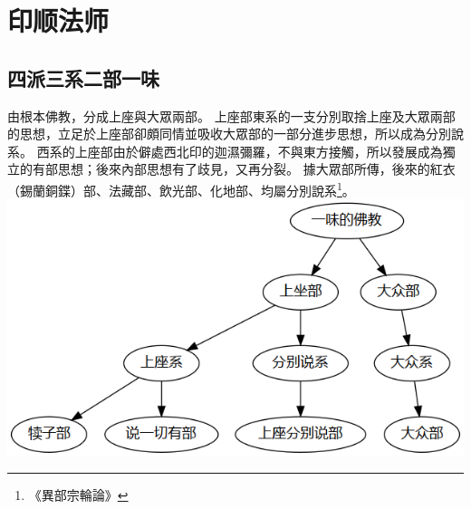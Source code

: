 \section{印顺法师}
\subsection{四派三系二部一味}
由根本佛教，分成上座與大眾兩部。
上座部東系的一支分別取捨上座及大眾兩部的思想，立足於上座部卻頗同情並吸收大眾部的一部分進步思想，所以成為分別說系。
西系的上座部由於僻處西北印的迦濕彌羅，不與東方接觸，所以發展成為獨立的有部思想；後來內部思想有了歧見，又再分裂。
據大眾部所傳，後來的紅衣（錫蘭銅鍱）部、法藏部、飲光部、化地部、均屬分別說系\footnote{《異部宗輪論》}。
\includegraphics[scale=0.5]{释家/images/四派三系二部一味.png}
